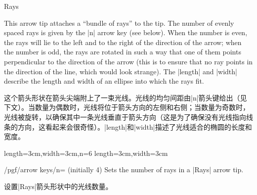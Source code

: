 \begin{arrowtip}{Rays}{
    This arrow tip attaches a ``bundle of rays'' to the tip. The number of
    evenly spaced rays is given by the |n| arrow key (see below). When the
    number is even, the rays will lie to the left and to the right of the
    direction of the arrow; when the number is odd, the rays are rotated in
    such a way that one of them points perpendicular to the direction of the
    arrow (this is to ensure that no ray points in the direction of the line,
    which would look strange). The |length| and |width| describe the length and
    width of an ellipse into which the rays fit.

    这个箭头形状在箭头尖端附上了一束光线。光线的均匀间距由|n|箭头键给出（见下文）。当数量为偶数时，光线将位于箭头方向的左侧和右侧；当数量为奇数时，光线被旋转，以确保其中一条光线垂直于箭头方向（这是为了确保没有光线指向线条的方向，这看起来会很奇怪）。|length|和|width|描述了光线适合的椭圆的长度和宽度。
}%
{length=3cm,width=3cm,n=6}%
{length=3cm,width=3cm}

    \begin{arrowexamples}
        \arrowexample[]
        \arrowexampledup[sep]
        \arrowexampledupdot[sep]
        \arrowexample[width'=0pt 2]
        \arrowexample[round]
        \arrowexample[n=2]
        \arrowexample[n=3]
        \arrowexample[n=4]
        \arrowexample[n=5]
        \arrowexample[n=6]
        \arrowexample[n=7]
        \arrowexample[n=8]
        \arrowexample[n=9]
        \arrowexample[slant=.3]
        \arrowexample[left]
        \arrowexample[right]
        \arrowexample[left,n=5]
        \arrowexample[right,n=5]
        \arrowexample[red]
    \end{arrowexamples}
\end{arrowtip}

\begin{key}{/pgf/arrow keys/n= (initially 4)}
    Sets the number of rays in a |Rays| arrow tip.

    设置|Rays|箭头形状中的光线数量。
\end{key}
